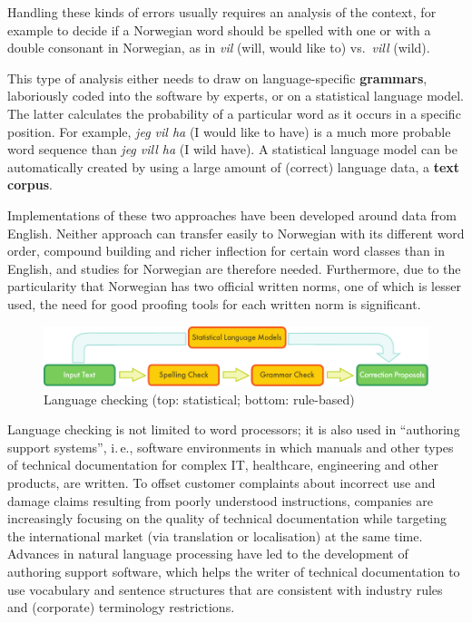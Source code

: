 \begin{multicols}{2}
Handling these kinds of errors usually requires an analysis of the context, for example to decide if a Norwegian word should be spelled with one or with a double consonant in Norwegian, as in \textit{vil} (will, would like to) vs.~\textit{vill} (wild).

This type of analysis either needs to draw on language-specific \textbf{grammars}, laboriously coded into the software by experts, or on a statistical language model. The latter calculates the probability of a particular word as it occurs in a specific position. For example, \textit{jeg vil ha} (I would like to have) is a much more probable word sequence than \textit{jeg vill ha} (I wild have). A statistical language model can be automatically created by using a large amount of (correct) language data, a \textbf{text corpus}.

Implementations of these two approaches have been developed around data from English. Neither approach can transfer easily to Norwegian with its different word order, compound building and richer inflection for certain word classes than in English, and studies for Norwegian are therefore needed. Furthermore, due to the particularity that Norwegian has two official written norms, one of which is lesser used, the need for good proofing tools for each written norm is significant. 

\begin{figure}[htb]
  \center
  \includegraphics[width=\textwidth]{../_media/english/language_checking}
  \caption{Language checking (top: statistical; bottom: rule-based)}
\label{fig:langcheckingaarch_en}
\end{figure}

Language checking is not limited to word processors; it is also used in “authoring support systems”, i.\,e., software environments in which manuals and other types of technical documentation for complex IT, healthcare, engineering and other products, are written. To offset customer complaints about incorrect use and damage claims resulting from poorly understood instructions, companies are increasingly focusing on the quality of technical documentation while targeting the international market (via translation or localisation) at the same time. Advances in natural language processing have led to the development of authoring support software, which helps the writer of technical documentation to use vocabulary and sentence structures that are consistent with industry rules and (corporate) terminology restrictions.


\end{multicols}
